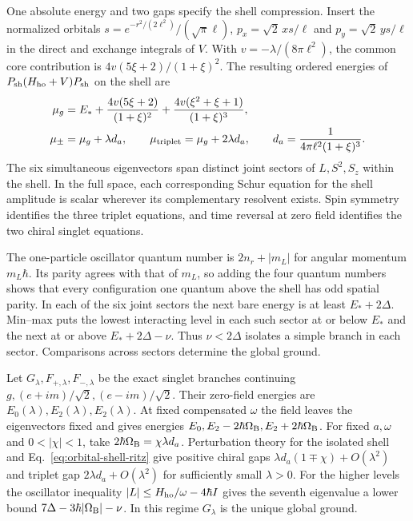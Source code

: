 \documentclass[11pt]{article}
\theoremstyle{definition}
\begin{document}
One absolute energy and two gaps specify the shell compression. Insert the normalized orbitals $s=e^{-r^2/(2\ell^2)}/(\sqrt\pi\ell)$, $p_x=\sqrt2\,xs/\ell$ and $p_y=\sqrt2\,ys/\ell$ in the direct and exchange integrals of $V$. With $v=-\lambda/(8\pi\ell^2)$, the common core contribution is $4v(5\xi+2)/(1+\xi)^2$. The resulting ordered energies of $P_{\rm sh}(H_{\rm ho}+V)P_{\rm sh}$ on the shell are
\begin{align}
 \mu_g&=E_*+\frac{4v(5\xi+2)}{(1+\xi)^2}+\frac{4v(\xi^2+\xi+1)}{(1+\xi)^3},\nonumber\\
 \mu_{\pm}&=\mu_g+\lambda d_a,\qquad
 \mu_{\rm triplet}=\mu_g+2\lambda d_a,\qquad
 d_a=\frac{1}{4\pi\ell^2(1+\xi)^3}.
 \label{eq:orbital-shell-ritz}
\end{align}
The six simultaneous eigenvectors span distinct joint sectors of $L,S^2,S_z$ within the shell. In the full space, each corresponding Schur equation for the shell amplitude is scalar wherever its complementary resolvent exists. Spin symmetry identifies the three triplet equations, and time reversal at zero field identifies the two chiral singlet equations.

The one-particle oscillator quantum number is $2n_r+|m_L|$ for angular momentum $m_L\hbar$. Its parity agrees with that of $m_L$, so adding the four quantum numbers shows that every configuration one quantum above the shell has odd spatial parity. In each of the six joint sectors the next bare energy is at least $E_*+2\Delta$. Min--max puts the lowest interacting level in each such sector at or below $E_*$ and the next at or above $E_*+2\Delta-\nu$. Thus $\nu<2\Delta$ isolates a simple branch in each sector. Comparisons across sectors determine the global ground.

Let $G_\lambda,F_{+,\lambda},F_{-,\lambda}$ be the exact singlet branches continuing $g,(e+im)/\sqrt2,(e-im)/\sqrt2$. Their zero-field energies are $E_0(\lambda),E_2(\lambda),E_2(\lambda)$. At fixed compensated $\omega$ the field leaves the eigenvectors fixed and gives energies $E_0,E_2-2\hbar\Omega_{\rm B},E_2+2\hbar\Omega_{\rm B}$. For fixed $a,\omega$ and $0<|\chi|<1$, take $2\hbar\Omega_{\rm B}=\chi\lambda d_a$. Perturbation theory for the isolated shell \cite{Kato} and Eq.~\eqref{eq:orbital-shell-ritz} give positive chiral gaps $\lambda d_a(1\mp\chi)+O(\lambda^2)$ and triplet gap $2\lambda d_a+O(\lambda^2)$ for sufficiently small $\lambda>0$. For the higher levels the oscillator inequality $|L|\le H_{\rm ho}/\omega-4\hbar I$ gives the seventh eigenvalue a lower bound $7\Delta-3\hbar|\Omega_{\rm B}|-\nu$. In this regime $G_\lambda$ is the unique global ground.
\end{document}
